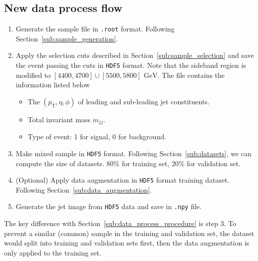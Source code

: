 \documentclass[12pt]{article}
\begin{document}
    \subsection{New data process flow}%
    \label{sub:new_data_process_flow}
        \begin{enumerate}
            \item Generate the sample file in \verb|.root| format. Following Section~\ref{sub:sample_generation}.
            \item Apply the selection cuts described in Section~\ref{sub:sample_selection} and save the event passing the cuts in \verb|HDF5| format. Note that the sideband region is modified to $[4400,4700] \cup [5500,5800] \text{ GeV}$. The file contains the information listed below 
                \begin{itemize}
                    \item The $\left( p_{\text{T}}, \eta, \phi \right) $ of leading and sub-leading jet constituents.
                    \item Total invariant mass $m_{jj}$.
                    \item Type of event: 1 for signal, 0 for background.    
                \end{itemize}
            \item Make mixed sample in \verb|HDF5| format. Following Section~\ref{sub:datasets}, we can compute the size of datasets. 80\% for training set, 20\% for validation set.
            \item (Optional) Apply data augmentation in \verb|HDF5| format training dataset. Following Section~\ref{sub:data_augmentation}.
            \item Generate the jet image from \verb|HDF5| data and save in \verb|.npy| file.
        \end{enumerate}
        The key difference with Section~\ref{sub:data_process_procedure} is step 3. To prevent a similar (common) sample in the training and validation set, the dataset would split into training and validation sets first, then the data augmentation is only applied to the training set.
\end{document}
